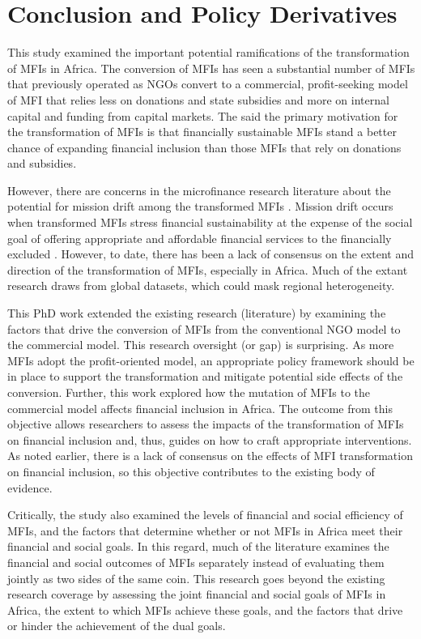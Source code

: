 \documentclass[a4paper, nobind]{templates/ociamthesis}
\begin{document}
\hypertarget{conclusion-and-policy-derivatives}{%
\chapter{Conclusion and Policy Derivatives}\label{conclusion-and-policy-derivatives}}

This study examined the important potential ramifications of the transformation of MFIs in Africa. The conversion of MFIs has seen a substantial number of MFIs that previously operated as NGOs convert to a commercial, profit-seeking model of MFI that relies less on donations and state subsidies and more on internal capital and funding from capital markets. The said the primary motivation for the transformation of MFIs is that financially sustainable MFIs stand a better chance of expanding financial inclusion than those MFIs that rely on donations and subsidies.

However, there are concerns in the microfinance research literature about the potential for mission drift among the transformed MFIs \autocite{armendariz2011mission,serrano2014microfinance}. Mission drift occurs when transformed MFIs stress financial sustainability at the expense of the social goal of offering appropriate and affordable financial services to the financially excluded \autocite{d2017ngos}. However, to date, there has been a lack of consensus on the extent and direction of the transformation of MFIs, especially in Africa. Much of the extant research draws from global datasets, which could mask regional heterogeneity.

This PhD work extended the existing research (literature) by examining the factors that drive the conversion of MFIs from the conventional NGO model to the commercial model. This research oversight (or gap) is surprising. As more MFIs adopt the profit-oriented model, an appropriate policy framework should be in place to support the transformation and mitigate potential side effects of the conversion. Further, this work explored how the mutation of MFIs to the commercial model affects financial inclusion in Africa. The outcome from this objective allows researchers to assess the impacts of the transformation of MFIs on financial inclusion and, thus, guides on how to craft appropriate interventions. As noted earlier, there is a lack of consensus on the effects of MFI transformation on financial inclusion, so this objective contributes to the existing body of evidence.

Critically, the study also examined the levels of financial and social efficiency of MFIs, and the factors that determine whether or not MFIs in Africa meet their financial and social goals. In this regard, much of the literature examines the financial and social outcomes of MFIs separately instead of evaluating them jointly as two sides of the same coin. This research goes beyond the existing research coverage by assessing the joint financial and social goals of MFIs in Africa, the extent to which MFIs achieve these goals, and the factors that drive or hinder the achievement of the dual goals.
\end{document}
